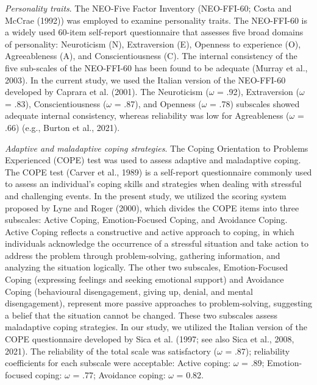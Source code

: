\documentclass[
  man,floatsintext]{apa7}
\begin{document}
\emph{Personality traits}. The NEO-Five Factor Inventory (NEO-FFI-60; Costa and McCrae (1992)) was employed to examine personality traits. The NEO-FFI-60 is a widely used 60-item self-report questionnaire that assesses five broad domains of personality: Neuroticism (N), Extraversion (E), Openness to experience (O), Agreeableness (A), and Conscientiousness (C). The internal consistency of the five sub-scales of the NEO-FFI-60 has been found to be adequate (Murray et al., 2003). In the current study, we used the Italian version of the NEO-FFI-60 developed by Caprara et al. (2001). The Neuroticism (\(\omega\) = .92), Extraversion (\(\omega\) = .83), Conscientiousness (\(\omega\) = .87), and Openness (\(\omega\) = .78) subscales showed adequate internal consistency, whereas reliability was low for Agreableness (\(\omega\) = .66) (e.g., Burton et al., 2021).

\emph{Adaptive and maladaptive coping strategies}. The Coping Orientation to Problems Experienced (COPE) test was used to assess adaptive and maladaptive coping. The COPE test (Carver et al., 1989) is a self-report questionnaire commonly used to assess an individual's coping skills and strategies when dealing with stressful and challenging events. In the present study, we utilized the scoring system proposed by Lyne and Roger (2000), which divides the COPE items into three subscales: Active Coping, Emotion-Focused Coping, and Avoidance Coping. Active Coping reflects a constructive and active approach to coping, in which individuals acknowledge the occurrence of a stressful situation and take action to address the problem through problem-solving, gathering information, and analyzing the situation logically. The other two subscales, Emotion-Focused Coping (expressing feelings and seeking emotional support) and Avoidance Coping (behavioural disengagement, giving up, denial, and mental disengagement), represent more passive approaches to problem-solving, suggesting a belief that the situation cannot be changed. These two subscales assess maladaptive coping strategies. In our study, we utilized the Italian version of the COPE questionnaire developed by Sica et al. (1997; see also Sica et al., 2008, 2021). The reliability of the total scale was satisfactory (\(\omega\) = .87); reliability coefficients for each subscale were acceptable: Active coping: \(\omega\) = .89; Emotion-focused coping: \(\omega\) = .77; Avoidance coping: \(\omega\) = 0.82.
\end{document}
